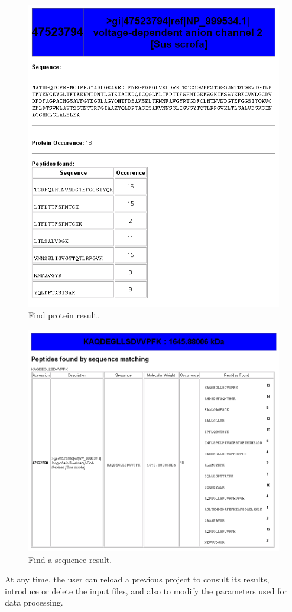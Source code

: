 \documentclass[a4paper,14pt]{extarticle}
\begin{document}
\begin{figure}[htbp]
\begin{center}
\includegraphics[scale=0.3]{Eppi_23}%
\caption{Find protein result.}\label{fig:findP}
\end{center}
\end{figure}

\begin{figure}[htbp]
\begin{center}
\includegraphics[scale=0.3]{Eppi_25}
\caption{Find a sequence result.}\label{fig:findS}
\end{center}
\end{figure}
 
At any time, the user can reload a previous project to consult its results, introduce or delete the input files, and also to modify the parameters used for data processing. 
\end{document}
